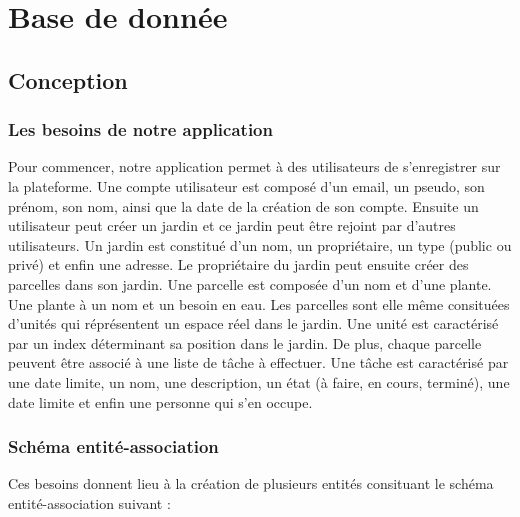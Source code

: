 \documentclass[french,a4paper]{article}
\begin{document}
\section{Base de donnée}
\subsection{Conception}
\subsubsection{Les besoins de notre application}
Pour commencer, notre application permet à des utilisateurs de s'enregistrer sur la plateforme. Une compte utilisateur est composé d'un
email, un pseudo, son prénom, son nom, ainsi que la date de la création de son compte. Ensuite un utilisateur peut créer un jardin
et ce jardin peut être rejoint par d'autres utilisateurs.
Un jardin est constitué d'un nom, un propriétaire, un type (public ou privé) et enfin une adresse. Le propriétaire du jardin peut
ensuite créer des parcelles dans son jardin. Une parcelle est composée d'un nom et d'une plante. Une plante à un nom et un besoin en eau. Les parcelles sont elle même consituées
d'unités qui réprésentent un espace réel dans le jardin. Une unité est caractérisé par un index déterminant sa position dans le jardin.
De plus, chaque parcelle peuvent être associé à une liste de tâche à effectuer. Une tâche est caractérisé par une date limite, un nom,
une description, un état (à faire, en cours, terminé), une date limite et enfin une personne qui s'en occupe.

\subsubsection{Schéma entité-association}

Ces besoins donnent lieu à la création de plusieurs entités consituant le schéma entité-association suivant :
\end{document}
